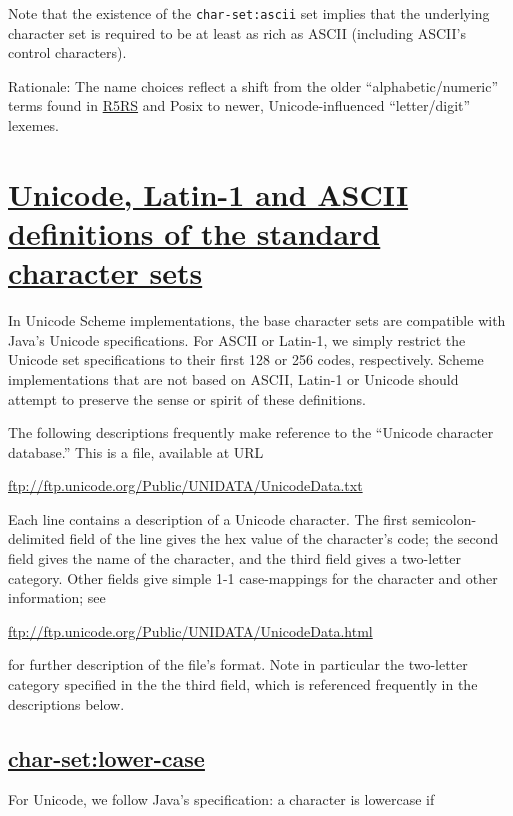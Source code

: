 Note that the existence of the \texttt{char-set:ascii} set implies that
the underlying character set is required to be at least as rich as ASCII
(including ASCII's control characters).

Rationale: The name choices reflect a shift from the older
``alphabetic/numeric'' terms found in \protect\hyperlink{R5RS}{R5RS} and
Posix to newer, Unicode-influenced ``letter/digit'' lexemes.

\section{\texorpdfstring{\href{}{Unicode, Latin-1 and ASCII definitions
of the standard character
sets}}{Unicode, Latin-1 and ASCII definitions of the standard character sets}}\label{unicode-latin-1-and-ascii-definitions-of-the-standard-character-sets}

In Unicode Scheme implementations, the base character sets are
compatible with Java's Unicode specifications. For ASCII or Latin-1, we
simply restrict the Unicode set specifications to their first 128 or 256
codes, respectively. Scheme implementations that are not based on ASCII,
Latin-1 or Unicode should attempt to preserve the sense or spirit of
these definitions.

The following descriptions frequently make reference to the ``Unicode
character database.'' This is a file, available at URL

\url{ftp://ftp.unicode.org/Public/UNIDATA/UnicodeData.txt}

Each line contains a description of a Unicode character. The first
semicolon-delimited field of the line gives the hex value of the
character's code; the second field gives the name of the character, and
the third field gives a two-letter category. Other fields give simple
1-1 case-mappings for the character and other information; see

\url{ftp://ftp.unicode.org/Public/UNIDATA/UnicodeData.html}

for further description of the file's format. Note in particular the
two-letter category specified in the the third field, which is
referenced frequently in the descriptions below.

\subsection{\texorpdfstring{\href{}{char-set:lower-case}}{char-set:lower-case}}\label{char-setlower-case}

For Unicode, we follow Java's specification: a character is lowercase if

